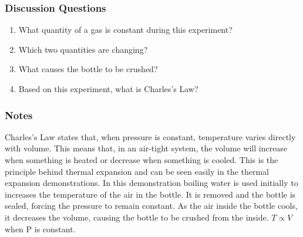 \subsubsection*{Discussion Questions}
\begin{enumerate}
\item{What quantity of a gas is constant during this experiment?}
\item{Which two quantities are changing?}
\item{What causes the bottle to be crushed?}
\item{Based on this experiment, what is Charles's Law?}
\end{enumerate}

\subsubsection*{Notes}
Charles's Law states that, when pressure is constant, temperature varies directly with volume. This means that, in an air-tight system, the volume will increase when something is heated or decrease when something is cooled. This is the principle behind thermal expansion and can be seen easily in the thermal expansion demonstrations.  
In this demonstration boiling water is used initially to increases the temperature of the air in the bottle. It is removed and the bottle is sealed, forcing the pressure to remain constant. As the air inside the bottle cools, it decreases the volume, causing the bottle to be crushed from the inside. $T \propto V$ when P is constant.
